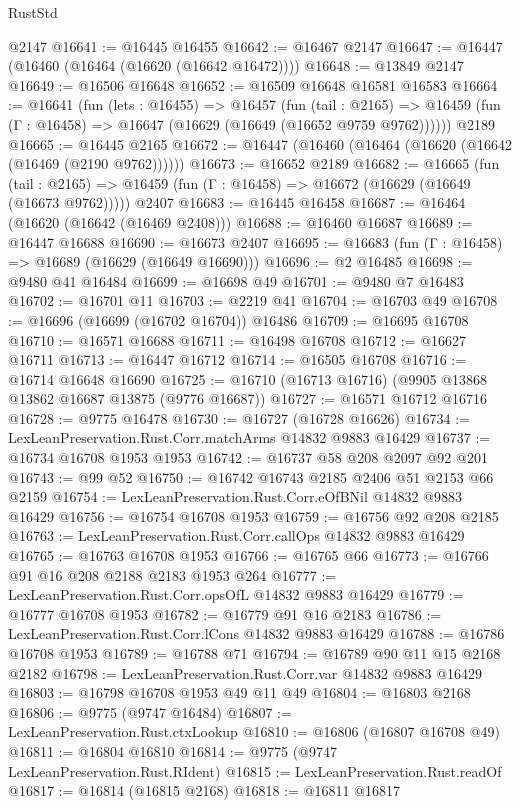 \begin{lexlean}{RustStd}
\begin{coremodule}
    @2147
@16641 := @16445 @16455
@16642 := @16467 @2147
@16647 := @16447 (@16460 (@16464 (@16620 (@16642 @16472))))
@16648 := @13849 @2147
@16649 := @16506 @16648
@16652 := @16509 @16648 @16581 @16583
@16664 := @16641
    (fun (lets : @16455) =>
    @16457
      (fun (tail : @2165) =>
      @16459 (fun (Γ : @16458) => @16647 (@16629 (@16649 (@16652 @9759 @9762))))))
    @2189
@16665 := @16445 @2165
@16672 := @16447 (@16460 (@16464 (@16620 (@16642 (@16469 (@2190 @9762))))))
@16673 := @16652 @2189
@16682 := @16665
    (fun (tail : @2165) => @16459 (fun (Γ : @16458) => @16672 (@16629 (@16649 (@16673 @9762)))))
    @2407
@16683 := @16445 @16458
@16687 := @16464 (@16620 (@16642 (@16469 @2408)))
@16688 := @16460 @16687
@16689 := @16447 @16688
@16690 := @16673 @2407
@16695 := @16683 (fun (Γ : @16458) => @16689 (@16629 (@16649 @16690)))
@16696 := @2 @16485
@16698 := @9480 @41 @16484
@16699 := @16698 @49
@16701 := @9480 @7 @16483
@16702 := @16701 @11
@16703 := @2219 @41
@16704 := @16703 @49
@16708 := @16696 (@16699 (@16702 @16704)) @16486
@16709 := @16695 @16708
@16710 := @16571 @16688
@16711 := @16498 @16708
@16712 := @16627 @16711
@16713 := @16447 @16712
@16714 := @16505 @16708
@16716 := @16714 @16648 @16690
@16725 := @16710 (@16713 @16716) (@9905 @13868 @13862 @16687 @13875 (@9776 @16687))
@16727 := @16571 @16712 @16716
@16728 := @9775 @16478
@16730 := @16727 (@16728 @16626)
@16734 := LexLeanPreservation.Rust.Corr.matchArms @14832 @9883 @16429
@16737 := @16734 @16708 @1953 @1953
@16742 := @16737 @58 @208 @2097 @92 @201
@16743 := @99 @52
@16750 := @16742 @16743 @2185 @2406 @51 @2153 @66 @2159
@16754 := LexLeanPreservation.Rust.Corr.eOfBNil @14832 @9883 @16429
@16756 := @16754 @16708 @1953
@16759 := @16756 @92 @208 @2185
@16763 := LexLeanPreservation.Rust.Corr.callOps @14832 @9883 @16429
@16765 := @16763 @16708 @1953
@16766 := @16765 @66
@16773 := @16766 @91 @16 @208 @2188 @2183 @1953 @264
@16777 := LexLeanPreservation.Rust.Corr.opsOfL @14832 @9883 @16429
@16779 := @16777 @16708 @1953
@16782 := @16779 @91 @16 @2183
@16786 := LexLeanPreservation.Rust.Corr.lCons @14832 @9883 @16429
@16788 := @16786 @16708 @1953
@16789 := @16788 @71
@16794 := @16789 @90 @11 @15 @2168 @2182
@16798 := LexLeanPreservation.Rust.Corr.var @14832 @9883 @16429
@16803 := @16798 @16708 @1953 @49 @11 @49
@16804 := @16803 @2168
@16806 := @9775 (@9747 @16484)
@16807 := LexLeanPreservation.Rust.ctxLookup
@16810 := @16806 (@16807 @16708 @49)
@16811 := @16804 @16810
@16814 := @9775 (@9747 LexLeanPreservation.Rust.RIdent)
@16815 := LexLeanPreservation.Rust.readOf
@16817 := @16814 (@16815 @2168)
@16818 := @16811 @16817

\end{coremodule}
\end{lexlean}
